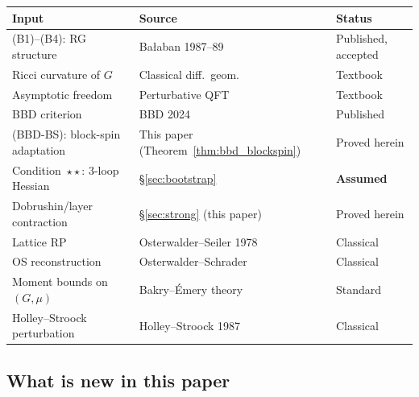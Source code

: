 \documentclass[11pt,a4paper]{article}
\theoremstyle{plain}
\theoremstyle{definition}
\theoremstyle{remark}
\begin{document}
\begin{center}
\renewcommand{\arraystretch}{1.3}
\begin{tabular}{@{}p{5.5cm}lp{4cm}@{}}
\toprule
\textbf{Input} & \textbf{Source} & \textbf{Status} \\
\midrule
(B1)--(B4): RG structure & Ba{\l}aban 1987--89 & Published, accepted \\
Ricci curvature of $G$ & Classical diff.\ geom. & Textbook \\
Asymptotic freedom & Perturbative QFT & Textbook \\
BBD criterion & BBD 2024 & Published \\
(BBD-BS): block-spin adaptation & This paper (Theorem~\ref{thm:bbd_blockspin}) & Proved herein \\
Condition~$\star\star$: 3-loop Hessian & \S\ref{sec:bootstrap} & \textbf{Assumed} \\
Dobrushin/layer contraction & \S\ref{sec:strong} (this paper) & Proved herein \\
Lattice RP & Osterwalder--Seiler 1978 & Classical \\
OS reconstruction & Osterwalder--Schrader & Classical \\
Moment bounds on $(G,\mu)$ & Bakry--\'Emery theory & Standard \\
Holley--Stroock perturbation & Holley--Stroock 1987 & Classical \\
\bottomrule
\end{tabular}
\end{center}

\subsection{What is new in this paper}
\end{document}
